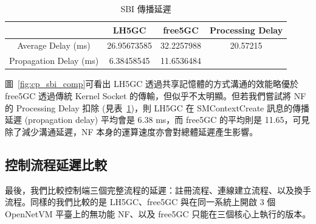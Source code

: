 \begin{table}[htbp]
    \centering
    \begin{tabular}{|c|c|c|c|}
        \hline
        & LH5GC & free5GC & Processing Delay \\
        \hline
        Average Delay (ms) & 26.95673585 & 32.2257988 & 20.57215 \\
        \hline
        Propagation Delay (ms) & 6.38458545 & 11.6536484 & \\
        \hline
    \end{tabular}
    \caption[SBI 傳播延遲]{{\footnotesize SBI 傳播延遲}}
    \label{tab:cp_sbi_propagation}
\end{table}

圖~\ref{fig:cp_sbi_comp}可看出 LH5GC 透過共享記憶體的方式溝通的效能略優於 free5GC 透過傳統 Kernel Socket 的傳輸，但似乎不太明顯。但若我們嘗試將 NF 的 Processing Delay 扣除 (見表~\ref{tab:cp_sbi_propagation})，則 LH5GC 在 SMContextCreate 訊息的傳播延遲 (propagation delay) 平均會是 6.38 ms，而 free5GC 的平均則是 11.65，可見除了減少溝通延遲，NF 本身的運算速度亦會對總體延遲產生影響。

\subsection{控制流程延遲比較}
\label{subsec:cp_proc_comp}

最後，我們比較控制端三個完整流程的延遲：註冊流程、連線建立流程、以及換手流程。同樣的我們比較的是 LH5GC、free5GC 與在同一系統上開啟 3 個 OpenNetVM 平臺上的無功能 NF、以及 free5GC 只能在三個核心上執行的版本。

